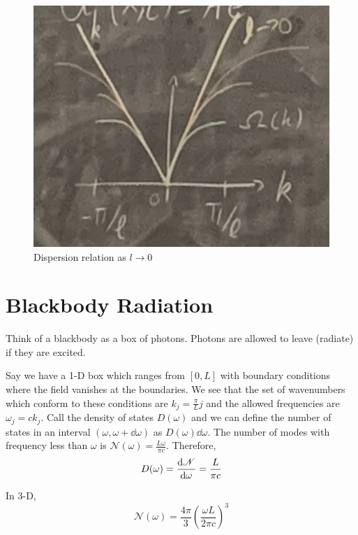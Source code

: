 \documentclass[a4paper,twoside,master.tex]{subfiles}
\begin{document}
\begin{figure}[h]
    \centering
    \includegraphics[width=\textwidth/2]{figures/lec_39_dispersion_relation.jpg}
    \caption{Dispersion relation as $ l \to 0 $}
    \label{fig:dispersion_relation_continuum}
\end{figure}

\section{Blackbody Radiation}
\label{sec:blackbody_radiation}

Think of a blackbody as a box of photons. Photons are allowed to leave (radiate) if they are excited.

Say we have a 1-D box which ranges from $ [0,L] $ with boundary conditions where the field vanishes at the boundaries. We see that the set of wavenumbers which conform to these conditions are $ k_j = \frac{\pi}{L} j $ and the allowed frequencies are $ \omega_j = ck_j $. Call the density of states $ D(\omega) $ and we can define the number of states in an interval $ (\omega, \omega + \dd{\omega}) $ as $ D(\omega) \dd{\omega} $. The number of modes with frequency less than $\omega$ is $ \mathscr{N}(\omega) = \frac{L \omega}{\pi c} $. Therefore,
\begin{equation}
    D(\omega) = \dv{\mathscr{N}}{\omega} = \frac{L}{\pi c}
\end{equation}

In 3-D,
\begin{equation}
    \mathscr{N}(\omega) = \frac{4 \pi}{3} \left( \frac{\omega L}{2 \pi c} \right)^3
\end{equation}
\end{document}
